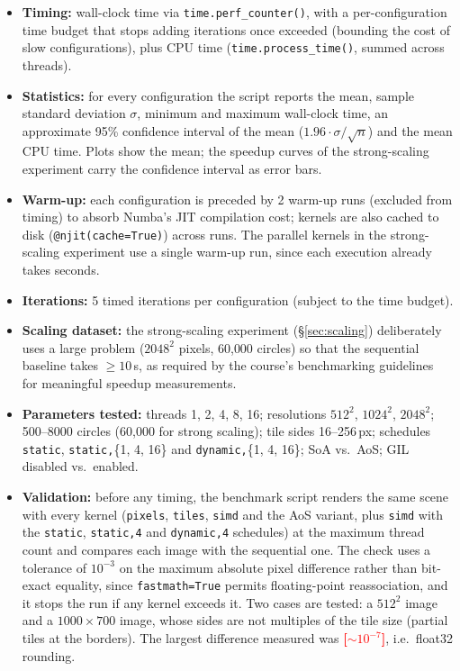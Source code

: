 \documentclass[10pt,twocolumn,letterpaper]{article}
\newcommand{\tbd}[1]{\textcolor{red}{\textbf{[#1]}}}
\begin{document}
\begin{itemize}[itemsep=1pt,topsep=2pt]
  \item \textbf{Timing:} wall-clock time via \texttt{time.perf\_counter()}, with a per-configuration time budget that stops adding
    iterations once exceeded (bounding the cost of slow configurations), plus
    CPU time (\texttt{time.process\_time()}, summed across threads).
  \item \textbf{Statistics:} for every configuration the script reports the
    mean, sample standard deviation $\sigma$, minimum and maximum wall-clock
    time, an approximate 95\% confidence interval of the mean
    ($1.96\cdot\sigma/\sqrt{n}$) and the mean CPU time. Plots show the mean;
    the speedup curves of the strong-scaling experiment carry the confidence
    interval as error bars.
  \item \textbf{Warm-up:} each configuration is preceded by 2 warm-up runs
    (excluded from timing) to absorb Numba's JIT compilation cost; kernels are
    also cached to disk (\texttt{@njit(cache=True)}) across runs. The
    parallel kernels in the strong-scaling experiment use a single warm-up
    run, since each execution already takes seconds.
  \item \textbf{Iterations:} 5 timed iterations per configuration (subject to
    the time budget).
  \item \textbf{Scaling dataset:} the strong-scaling experiment (\S\ref{sec:scaling})
    deliberately uses a large problem ($2048^2$ pixels, 60{,}000 circles) so
    that the sequential baseline takes $\ge 10\,$s, as required by the
    course's benchmarking guidelines~\cite{slides} for meaningful speedup measurements.
  \item \textbf{Parameters tested:} threads 1, 2, 4, 8, 16; resolutions
    $512^2$, $1024^2$, $2048^2$; 500--8000 circles (60{,}000 for strong
    scaling); tile sides 16--256\,px; schedules \texttt{static},
    \texttt{static,}\{1, 4, 16\} and \texttt{dynamic,}\{1, 4, 16\}; SoA
    vs.\ AoS; GIL disabled vs.\ enabled.
  \item \textbf{Validation:} before any timing, the benchmark script renders
    the same scene with every kernel (\texttt{pixels}, \texttt{tiles},
    \texttt{simd} and the AoS variant, plus \texttt{simd} with the
    \texttt{static}, \texttt{static,4} and \texttt{dynamic,4} schedules)
    at the maximum thread count and compares each image with the sequential
    one. The check uses a tolerance
    of $10^{-3}$ on the maximum absolute pixel difference rather than
    bit-exact equality, since \texttt{fastmath=True} permits floating-point
    reassociation, and it stops the run if any kernel exceeds it. Two cases
    are tested: a $512^2$ image and a $1000\times700$ image, whose sides are
    not multiples of the tile size (partial tiles at the borders). The largest
    difference measured was \tbd{$\sim\!10^{-7}$}, i.e.\ float32 rounding.
\end{itemize}
\end{document}
